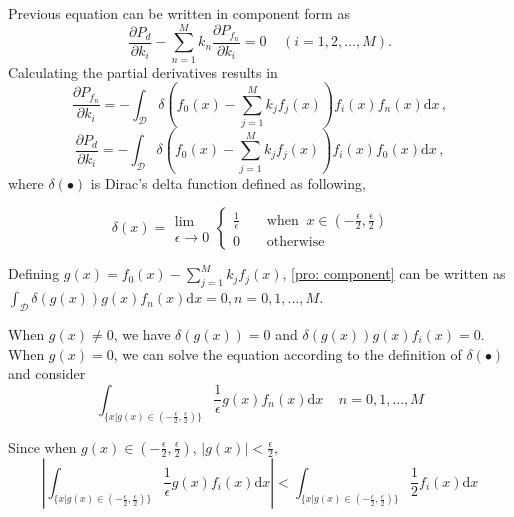 \documentclass[12pt,journal,a4paper,twoside,onecolumn,draft]{IEEEtran}
\begin{document}
\begin{spacing}{2.5}
Previous equation can be written in component form as
\begin{equation}
\label{pro: component}
\frac{\partial P_d}{\partial k_i} - \sum_{n=1}^{M}k_n\frac{\partial P_{f_n}}{\partial k_i} = 0 \;\;\;\;(i=1, 2, ..., M).
\end{equation}
Calculating the  partial derivatives results in
\begin{equation}
\label{pro: Pf par k}
\frac{\partial P_{f_n}}{ \partial k_i} = - \int_{\mathcal{D}}\delta (f_0(x) - \sum_{j=1}^{M}k_jf_j(x))f_i(x)f_n(x) \mathrm{d}x\,,
\end{equation}
\label{pro: Pd par k}
\begin{equation}\frac{\partial P_d}{ \partial k_i} = - \int_{\mathcal{D}}\delta (f_0(x) - \sum_{j=1}^{M}k_jf_j(x))f_i(x)f_0(x) \mathrm{d}x\,,
\end{equation}
where $\delta(\bullet)$ is Dirac's delta function defined as following,

\begin{equation}
\label{pro: delta}
\delta(x) = \substack{\lim \\ \epsilon \rightarrow 0} \begin{cases}
\frac{1}{\epsilon}\;\;\;\;&\text{when} \;\;x \in (-\frac{\epsilon}{2}, \frac{\epsilon}{2})\\
0\;\;\;\;&\text{otherwise}
\end{cases} \;\;\;\;
\end{equation}

Defining $g(x) = f_0(x) - \sum_{j=1}^{M} k_jf_j(x)$, \eqref{pro: component} can be written as $\int_{\mathcal{D}}\delta(g(x))g(x)f_n(x)\mathrm{d}x = 0, n = 0, 1, ..., M$.

When $g(x) \neq 0$, we have $\delta(g(x)) = 0$ and $\delta(g(x))g(x)f_i(x) = 0$.   When  $g(x) = 0$, we can solve the equation according to the definition of $\delta(\bullet)$ and consider
\begin{equation}
\label{pro: important}
\int_{\{x|g(x)\in (-\frac{\epsilon}{2}, \frac{\epsilon}{2})\}} \frac{1}{\epsilon} g(x)f_n(x) \mathrm{d}x\;\;\;\;n=0, 1, ..., M
\end{equation}

Since when $g(x) \in (-\frac{\epsilon}{2}, \frac{\epsilon}{2})$, $|g(x)| < \frac{\epsilon}{2}$,
\begin{equation}|
\int_{\{x|g(x)\in (-\frac{\epsilon}{2}, \frac{\epsilon}{2})\}} \frac{1}{\epsilon} g(x)f_i(x) \mathrm{d}x | <
\int_{\{x|g(x)\in (-\frac{\epsilon}{2}, \frac{\epsilon}{2})\}} \frac{1}{2}f_i(x) \mathrm{d}x
\end{equation}


\end{spacing}
\end{document}
